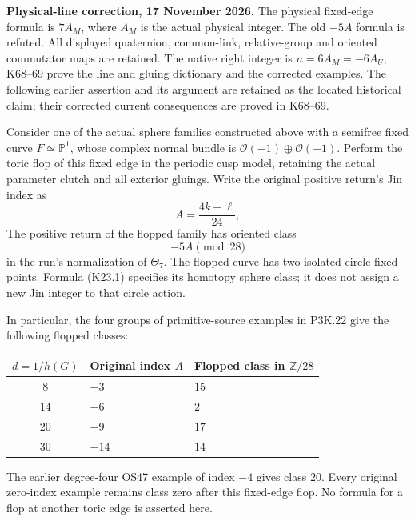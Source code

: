 \begin{theorem}\label{night:P3K.23}
\par\noindent\textbf{Physical-line correction, 17 November 2026.} The physical fixed-edge formula is \(7A_M\), where \(A_M\) is the actual physical integer. The old \(-5A\) formula is refuted. All displayed quaternion, common-link, relative-group and oriented commutator maps are retained. The native right integer is \(n=6A_M=-6A_U\); K68--69 prove the line and gluing dictionary and the corrected examples. The following earlier assertion and its argument are retained as the located historical claim; their corrected current consequences are proved in K68--69.\medskip\par 
Consider one of the actual sphere families constructed above with a
semifree fixed curve \(F\simeq\mathbb P^1\), whose complex normal bundle
is \(\mathcal O(-1)\oplus\mathcal O(-1)\). Perform the toric flop of
this fixed edge in the periodic cusp model, retaining the actual
parameter clutch and all exterior gluings. Write the original positive
return's Jin index as
\[
             A=\frac{4k-\ell}{24},
\]
The positive return of the flopped family has oriented class
\[
                         -5A\pmod {28}                 \tag{K23.1}
\]
in the run's normalization of \(\Theta _7\). The flopped curve has two
isolated circle fixed points. Formula (K23.1) specifies its homotopy
sphere class; it does not assign a new Jin integer to that circle
action.

In particular, the four groups of primitive-source examples in
P3K.22 give the following flopped classes:


\begin{center}\small\begin{tabular}{c l l}\hline
\(d=1/h(G)\) & Original index \(A\) & Flopped class in \(\mathbb Z/28\) \\
\hline
\(8\) & \(-3\) & \(15\) \\
\(14\) & \(-6\) & \(2\) \\
\(20\) & \(-9\) & \(17\) \\
\(30\) & \(-14\) & \(14\) \\
\hline\end{tabular}\end{center}

The earlier degree-four OS47 example of index \(-4\) gives class
\(20\). Every original zero-index example remains class zero after
this fixed-edge flop. No formula for a flop at another toric edge is
asserted here.
\end{theorem}

